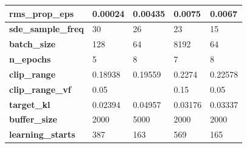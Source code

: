 \documentclass[../xlapes02]{subfiles}
\begin{document}
\begin{table}[h!]
{\begin{tabular}{|l||l|l||l|l|}
                \textbf{rms\_prop\_eps}            & 0.00024                                      & 0.00435                                      & 0.0075                                       & 0.0067                                       \\ \hline
                \textbf{sde\_sample\_freq}         & 30                                           & 26                                           & 23                                           & 15                                           \\ \hline
                \textbf{batch\_size}               & 128                                          & 64                                           & 8192                                         & 64                                           \\ \hline
                \textbf{n\_epochs}                 & 5                                            & 8                                            & 7                                            & 8                                            \\ \hline
                \textbf{clip\_range}               & 0.18938                                      & 0.19559                                      & 0.2274                                       & 0.22578                                      \\ \hline
                \textbf{clip\_range\_vf}           & 0.05                                         & ~                                            & 0.15                                         & 0.05                                         \\ \hline
                \textbf{target\_kl}                & 0.02394                                      & 0.04957                                      & 0.03176                                      & 0.03337                                      \\ \hline
                \textbf{buffer\_size}              & 2000                                         & 5000                                         & 2000                                         & 2000                                         \\ \hline
                \textbf{learning\_starts}          & 387                                          & 163                                          & 569                                          & 165                                          \\ \hline

\end{tabular}}
\end{table}
\end{document}
